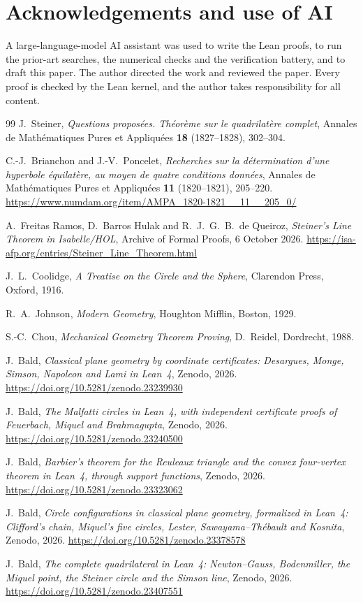 \documentclass[11pt]{article}
\theoremstyle{definition}
\theoremstyle{remark}
\begin{document}
\section*{Acknowledgements and use of AI}
A large-language-model AI assistant was used to write the Lean proofs, to run the prior-art searches,
the numerical checks and the verification battery, and to draft this paper. The author directed the
work and reviewed the paper. Every proof is checked by the Lean kernel, and the author takes
responsibility for all content.

\begin{thebibliography}{99}
J.~Steiner,
\emph{Questions propos\'ees. Th\'eor\`eme sur le quadrilat\`ere complet},
Annales de Math\'ematiques Pures et Appliqu\'ees \textbf{18} (1827--1828), 302--304.

C.-J.~Brianchon and J.-V.~Poncelet,
\emph{Recherches sur la d\'etermination d'une hyperbole \'equilat\`ere, au moyen de quatre conditions donn\'ees},
Annales de Math\'ematiques Pures et Appliqu\'ees \textbf{11} (1820--1821), 205--220.
\url{https://www.numdam.org/item/AMPA_1820-1821__11__205_0/}

A.~Freitas Ramos, D.~Barros Hulak and R.~J.~G.~B.~de Queiroz,
\emph{Steiner's Line Theorem in Isabelle/HOL},
Archive of Formal Proofs, 6 October 2026.
\url{https://isa-afp.org/entries/Steiner_Line_Theorem.html}

J.~L.~Coolidge,
\emph{A Treatise on the Circle and the Sphere},
Clarendon Press, Oxford, 1916.

R.~A.~Johnson,
\emph{Modern Geometry},
Houghton Mifflin, Boston, 1929.

S.-C.~Chou,
\emph{Mechanical Geometry Theorem Proving},
D.~Reidel, Dordrecht, 1988.

J.~Bald,
\emph{Classical plane geometry by coordinate certificates: Desargues, Monge, Simson, Napoleon and Lami in Lean~4},
Zenodo, 2026. \url{https://doi.org/10.5281/zenodo.23239930}

J.~Bald,
\emph{The Malfatti circles in Lean~4, with independent certificate proofs of Feuerbach, Miquel and Brahmagupta},
Zenodo, 2026. \url{https://doi.org/10.5281/zenodo.23240500}

J.~Bald,
\emph{Barbier's theorem for the Reuleaux triangle and the convex four-vertex theorem in Lean~4, through support functions},
Zenodo, 2026. \url{https://doi.org/10.5281/zenodo.23323062}

J.~Bald,
\emph{Circle configurations in classical plane geometry, formalized in Lean~4: Clifford's chain, Miquel's five circles, Lester, Sawayama--Th\'ebault and Kosnita},
Zenodo, 2026. \url{https://doi.org/10.5281/zenodo.23378578}

J.~Bald,
\emph{The complete quadrilateral in Lean~4: Newton--Gauss, Bodenmiller, the Miquel point, the Steiner circle and the Simson line},
Zenodo, 2026. \url{https://doi.org/10.5281/zenodo.23407551}
\end{thebibliography}
\end{document}
